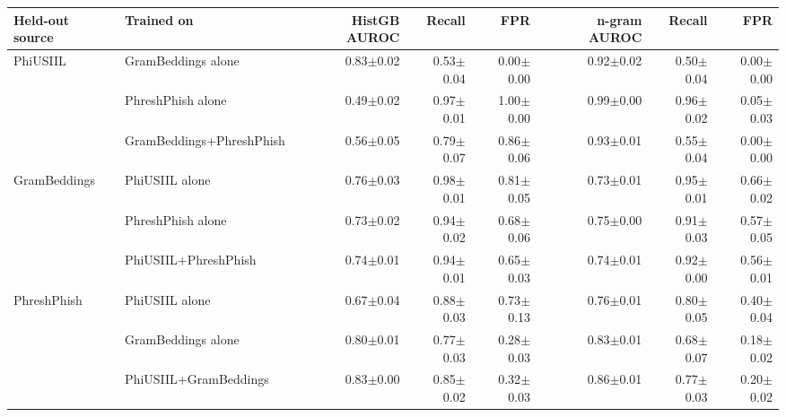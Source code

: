 {\scriptsize\setlength{\tabcolsep}{3.5pt}
\begin{tabular}{llrrrrrr}
\toprule
\textbf{Held-out source} & \textbf{Trained on} & \textbf{HistGB AUROC} & \textbf{Recall} & \textbf{FPR} & \textbf{n-gram AUROC} & \textbf{Recall} & \textbf{FPR} \\
\midrule
PhiUSIIL & GramBeddings alone & 0.83$\pm$0.02 & 0.53$\pm$0.04 & 0.00$\pm$0.00 & 0.92$\pm$0.02 & 0.50$\pm$0.04 & 0.00$\pm$0.00 \\
 & PhreshPhish alone & 0.49$\pm$0.02 & 0.97$\pm$0.01 & 1.00$\pm$0.00 & 0.99$\pm$0.00 & 0.96$\pm$0.02 & 0.05$\pm$0.03 \\
 & GramBeddings+PhreshPhish & 0.56$\pm$0.05 & 0.79$\pm$0.07 & 0.86$\pm$0.06 & 0.93$\pm$0.01 & 0.55$\pm$0.04 & 0.00$\pm$0.00 \\
\addlinespace
GramBeddings & PhiUSIIL alone & 0.76$\pm$0.03 & 0.98$\pm$0.01 & 0.81$\pm$0.05 & 0.73$\pm$0.01 & 0.95$\pm$0.01 & 0.66$\pm$0.02 \\
 & PhreshPhish alone & 0.73$\pm$0.02 & 0.94$\pm$0.02 & 0.68$\pm$0.06 & 0.75$\pm$0.00 & 0.91$\pm$0.03 & 0.57$\pm$0.05 \\
 & PhiUSIIL+PhreshPhish & 0.74$\pm$0.01 & 0.94$\pm$0.01 & 0.65$\pm$0.03 & 0.74$\pm$0.01 & 0.92$\pm$0.00 & 0.56$\pm$0.01 \\
\addlinespace
PhreshPhish & PhiUSIIL alone & 0.67$\pm$0.04 & 0.88$\pm$0.03 & 0.73$\pm$0.13 & 0.76$\pm$0.01 & 0.80$\pm$0.05 & 0.40$\pm$0.04 \\
 & GramBeddings alone & 0.80$\pm$0.01 & 0.77$\pm$0.03 & 0.28$\pm$0.03 & 0.83$\pm$0.01 & 0.68$\pm$0.07 & 0.18$\pm$0.02 \\
 & PhiUSIIL+GramBeddings & 0.83$\pm$0.00 & 0.85$\pm$0.02 & 0.32$\pm$0.03 & 0.86$\pm$0.01 & 0.77$\pm$0.03 & 0.20$\pm$0.02 \\
\bottomrule
\end{tabular}
}
